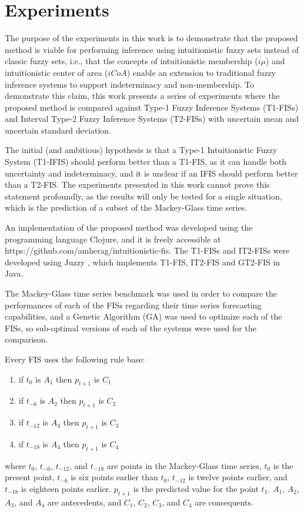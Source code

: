 \documentclass[conference]{IEEEtran}
\begin{document}
\section{Experiments}
\label{experiments}

The purpose of the experiments in this work is to demonstrate that the
proposed method is viable for performing inference using
intuitionistic fuzzy sets instead of classic fuzzy sets, i.e., that
the concepts of intuitionistic membership ($i\mu$) and intuitionistic
center of area ($iCoA$) enable an extension to traditional fuzzy
inference systems to support indeterminacy and non-membership. To
demonstrate this claim, this work presents a series of experiments
where the proposed method is compared against Type-1 Fuzzy Inference
Systems (T1-FISs) and Interval Type-2 Fuzzy Inference Systems
(T2-FISs) with uncertain mean and uncertain standard deviation.

The initial (and ambitious) hypothesis is that a Type-1 Intuitionistic Fuzzy System (T1-IFIS)
should perform better than a T1-FIS, as it can handle both uncertainty
and indeterminacy, and it is unclear if an IFIS should perform better
than a T2-FIS. The experiments presented in this work
cannot prove this statement profoundly, as the results will only be tested for a
single situation, which is the prediction of a subset of the
Mackey-Glass time series.

An implementation of the proposed method was developed using the
programming language Clojure, and it is freely accessible at
https://github.com/amherag/intuitionistic-fis. The T1-FISs and
IT2-FISs were developed using Juzzy \cite{wagner2013juzzy}, which
implements T1-FIS, IT2-FIS and GT2-FIS in Java.

The Mackey-Glass time series benchmark was used in order to compare
the performances of each of the FISs regarding their time series
forecasting capabilities, and a Genetic Algorithm (GA) was
used to optimize each of the FISs, so sub-optimal versions of each of
the systems were used for the comparison.

Every FIS uses the following rule base:

\begin{enumerate}
  \item if $t_{0}$ is $A_{1}$ then $p_{t+1}$ is $C_{1}$
  \item if $t_{-6}$ is $A_{2}$ then $p_{t+1}$ is $C_{2}$
  \item if $t_{-12}$ is $A_{3}$ then $p_{t+1}$ is $C_{3}$
  \item if $t_{-18}$ is $A_{4}$ then $p_{t+1}$ is $C_{4}$
\end{enumerate}
where $t_{0}$, $t_{-6}$, $t_{-12}$, and $t_{-18}$ are points in the
Mackey-Glass time series, $t_{0}$ is the present point, $t_{-6}$ is six
points earlier than $t_{0}$, $t_{-12}$ is twelve points earlier, and
$t_{-18}$ is eighteen points earlier. $p_{t+1}$ is the predicted value
for the point $t_{1}$. $A_{1}$, $A_{2}$, $A_{3}$, and $A_{4}$ are
antecedents, and $C_{1}$, $C_{2}$, $C_{3}$, and $C_{4}$ are
consequents.
\end{document}
